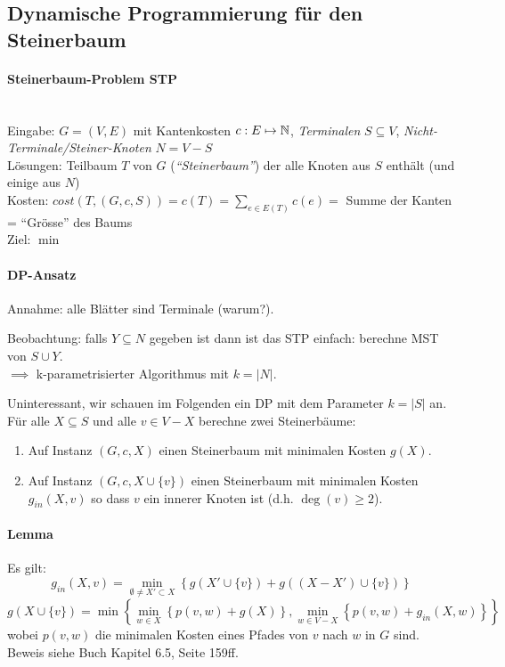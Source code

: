 \subsection{Dynamische Programmierung für den Steinerbaum}

\paragraph{Steinerbaum-Problem STP} \mbox{} \\
Eingabe: $G=(V,E)$ mit Kantenkosten $c : E \mapsto \mathbb{N}$, \emph{Terminalen} $S \subseteq V$,
\emph{Nicht-Terminale/Steiner-Knoten} $N = V-S$ \\
Lösungen: Teilbaum $T$ von $G$ (\emph{``Steinerbaum''}) der alle Knoten aus $S$ enthält (und einige aus $N$) \\
Kosten: $cost(T, (G,c,S)) = c(T) = \sum_{e\in E(T)} c(e) = $ Summe der Kanten = ``Grösse'' des Baums \\
Ziel: $\min$

\paragraph{DP-Ansatz}
Annahme: alle Blätter sind Terminale (warum?).

Beobachtung: falls $Y \subseteq N$ gegeben ist dann ist das STP einfach: berechne MST von $S \cup Y$. \\
$\implies$ k-parametrisierter Algorithmus mit $k = |N|$.

Uninteressant, wir schauen im Folgenden ein DP mit dem Parameter $k = |S|$ an.
Für alle $X \subseteq S$ und alle $v \in V-X$ berechne zwei Steinerbäume:
\begin{enumerate}
    \item Auf Instanz $(G, c, X)$ einen Steinerbaum mit minimalen Kosten $g(X)$.
    \item Auf Instanz $(G, c, X \cup \{v\})$ einen Steinerbaum mit minimalen Kosten $g_{in}(X, v)$ so dass $v$ ein innerer Knoten ist (d.h. $\deg(v) \geq 2$).
\end{enumerate}

\paragraph{Lemma}
Es gilt:
\begin{equation}
g_{in}(X, v) = \min_{\emptyset \neq X' \subset X} \left\{
    g(X' \cup \{v\}) + g \left( (X-X') \cup \{v\} \right)
\right\}
\end{equation}
\begin{equation}
g(X \cup \{v\}) = \min \left\{
    \min_{w \in X} \left\{ p(v,w) + g(X) \right\},
    \min_{w \in V-X} \left\{ p(v,w) + g_{in}(X,w) \right\}
\right\}
\end{equation}
wobei $p(v,w)$ die minimalen Kosten eines Pfades von $v$ nach $w$ in $G$ sind.
Beweis siehe Buch Kapitel 6.5, Seite 159ff.

